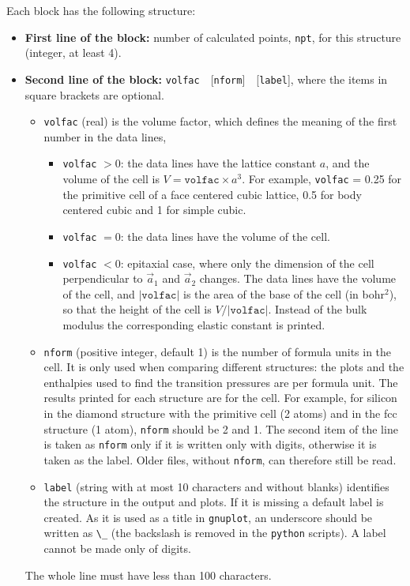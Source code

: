 \documentclass[11pt]{article}
\begin{document}
Each block has the following structure:

\begin{itemize}

\item[] \textbf{First line of the block:} number of calculated points, \texttt{npt},
  for this structure (integer, at least 4).

\item[] \textbf{Second line of the block:}
  \texttt{volfac}~~[\texttt{nform}]~~[\texttt{label}],
  where the items in square brackets are optional.
  \begin{itemize}
  \item[$\bullet$] \texttt{volfac} (real) is the volume factor, which defines
     the meaning of the first number in the data lines,
     \begin{itemize}
     \item[-] \texttt{volfac} $>0$: the data lines have the lattice constant $a$, and the
        volume of the cell is $V = \texttt{volfac} \times a^3$.  For example,
        \texttt{volfac} = 0.25 for the primitive cell of a face centered cubic lattice,
        0.5 for body centered cubic and 1 for simple cubic.
     \item[-] \texttt{volfac} $=0$: the data lines have the volume of the cell.
     \item[-] \texttt{volfac} $<0$: epitaxial case, where only the dimension
        of the cell perpendicular to $\vec a_1$ and $\vec a_2$ changes.
        The data lines have the volume of the cell, and $|\texttt{volfac}|$ is
        the area of the base of the cell (in bohr$^2$), so that the height of the cell
        is $V/|\texttt{volfac}|$.  Instead of the bulk modulus
        the corresponding elastic constant is printed.
     \end{itemize}
  \item[$\bullet$] \texttt{nform} (positive integer, default 1) is the number of
     formula units in the cell.  It is only used when comparing different structures:
     the plots and the enthalpies used to find the transition pressures are per
     formula unit.  The results printed for each structure are for the cell.
     For example, for silicon in the diamond structure with the primitive cell (2 atoms)
     and in the fcc structure (1 atom), \texttt{nform} should be 2 and 1.
     The second item of the line is taken as \texttt{nform} only if it is
     written only with digits, otherwise it is taken as the label.
     Older files, without \texttt{nform}, can therefore still be read.
  \item[$\bullet$] \texttt{label} (string with at most 10 characters and without blanks)
     identifies the structure in the output and plots.  If it is missing a default
     label is created.  As it is used as a title in \texttt{gnuplot},
     an underscore should be written as \verb|\_|
     (the backslash is removed in the \texttt{python} scripts).
     A label cannot be made only of digits.
  \end{itemize}
  The whole line must have less than 100 characters.


\end{itemize}
\end{document}
